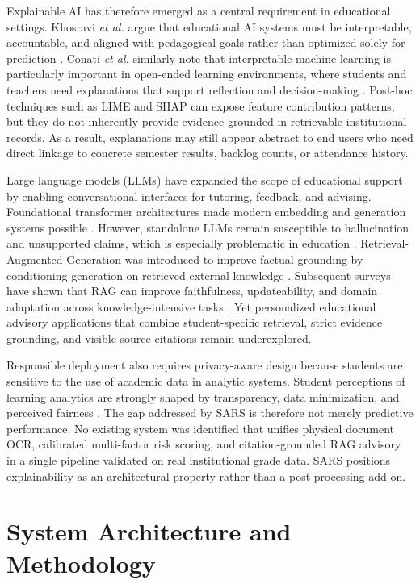\documentclass[conference]{IEEEtran}
\begin{document}
Explainable AI has therefore emerged as a central requirement in educational settings. Khosravi \emph{et al.} argue that educational AI systems must be interpretable, accountable, and aligned with pedagogical goals rather than optimized solely for prediction \cite{khosravi2022xai}. Conati \emph{et al.} similarly note that interpretable machine learning is particularly important in open-ended learning environments, where students and teachers need explanations that support reflection and decision-making \cite{conati2018interpretable}. Post-hoc techniques such as LIME and SHAP can expose feature contribution patterns, but they do not inherently provide evidence grounded in retrievable institutional records. As a result, explanations may still appear abstract to end users who need direct linkage to concrete semester results, backlog counts, or attendance history.

Large language models (LLMs) have expanded the scope of educational support by enabling conversational interfaces for tutoring, feedback, and advising. Foundational transformer architectures made modern embedding and generation systems possible \cite{vaswani2017attention,brown2020language}. However, standalone LLMs remain susceptible to hallucination and unsupported claims, which is especially problematic in education \cite{kasneci2023chatgpt}. Retrieval-Augmented Generation was introduced to improve factual grounding by conditioning generation on retrieved external knowledge \cite{lewis2020rag}. Subsequent surveys have shown that RAG can improve faithfulness, updateability, and domain adaptation across knowledge-intensive tasks \cite{gao2023rag}. Yet personalized educational advisory applications that combine student-specific retrieval, strict evidence grounding, and visible source citations remain underexplored.

Responsible deployment also requires privacy-aware design because students are sensitive to the use of academic data in analytic systems. Student perceptions of learning analytics are strongly shaped by transparency, data minimization, and perceived fairness \cite{ifenthaler2016privacy}. The gap addressed by SARS is therefore not merely predictive performance. No existing system was identified that unifies physical document OCR, calibrated multi-factor risk scoring, and citation-grounded RAG advisory in a single pipeline validated on real institutional grade data. SARS positions explainability as an architectural property rather than a post-processing add-on.

\section{System Architecture and Methodology}
\end{document}
